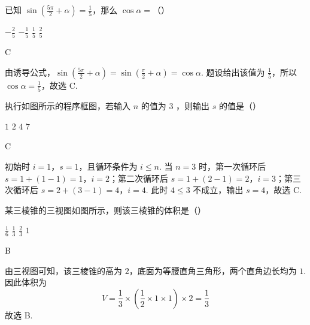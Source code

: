 \begin{problem}
已知 \(\sin \left(\frac{5\pi}{2} + \alpha\right) = \frac{1}{5}\)，那么 \(\cos \alpha =\)（\quad）

\choices
    {\(-\frac{2}{5}\)}
    {\(-\frac{1}{5}\)}
    {\(\frac{1}{5}\)}
    {\(\frac{2}{5}\)}
\end{problem}

\begin{answer}
C
\end{answer}

\begin{solution}
由诱导公式，\(\sin\left(\frac{5\pi}{2}+\alpha\right)=\sin\left(\frac{\pi}{2}+\alpha\right)=\cos\alpha\). 题设给出该值为 \(\frac15\)，所以 \(\cos\alpha=\frac15\)，故选 C.
\end{solution}

\begin{problem}
执行如图所示的程序框图，若输入 \(n\) 的值为 3 ，则输出 \(s\) 的值是（\quad）


\choices
    {\(1\)}
    {\(2\)}
    {\(4\)}
    {\(7\)}
\end{problem}

\begin{answer}
C
\end{answer}

\begin{solution}
初始时 \(i=1\)，\(s=1\)，且循环条件为 \(i\leq n\). 当 \(n=3\) 时，第一次循环后 \(s=1+(1-1)=1\)，\(i=2\)；第二次循环后 \(s=1+(2-1)=2\)，\(i=3\)；第三次循环后 \(s=2+(3-1)=4\)，\(i=4\). 此时 \(4\leq3\) 不成立，输出 \(s=4\)，故选 C.
\end{solution}

\begin{problem}
某三棱锥的三视图如图所示，则该三棱锥的体积是（\quad）


\choices
    {\( \frac{1}{6} \)}
    {\( \frac{1}{3} \)}
    {\( \frac{2}{3} \)}
    {\(1\)}
\end{problem}

\begin{answer}
B
\end{answer}

\begin{solution}
由三视图可知，该三棱锥的高为 \(2\)，底面为等腰直角三角形，两个直角边长均为 \(1\). 因此体积为
\[
V=\frac13\times\left(\frac12\times1\times1\right)\times2=\frac13
\]
故选 B.
\end{solution}

